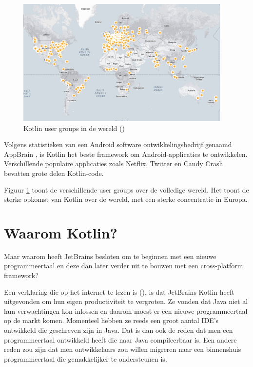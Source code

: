 \begin{figure} [ht]
	\centering
	\includegraphics[width=0.95\textwidth]{img/KUGmap.png}
	\caption{Kotlin user groups in de wereld (\cite{JetBrains12})}
	\label{fig:usergroups}
\end{figure}

Volgens statistieken van een Android software ontwikkelingsbedrijf genaamd AppBrain \autocite{AppBrain}, is Kotlin het beste framework om Android-applicaties te ontwikkelen. Verschillende populaire applicaties zoals Netflix, Twitter en Candy Crash bevatten grote delen Kotlin-code.

Figuur \ref{fig:usergroups} toont de verschillende user groups over de volledige wereld. Het toont de sterke opkomst van Kotlin over de wereld, met een sterke concentratie in Europa.

\section{Waarom Kotlin?}
\label{sec:whykotlin}
Maar waarom heeft JetBrains besloten om te beginnen met een nieuwe programmeertaal en deze dan later verder uit te bouwen met een cross-platform framework?

Een verklaring die op het internet te lezen is (\cite{TechYourChance}), is dat JetBrains Kotlin heeft uitgevonden om hun eigen productiviteit te vergroten. Ze vonden dat Java niet al hun verwachtingen kon inlossen en daarom moest er een nieuwe programmeertaal op de markt komen. Momenteel hebben ze reeds een groot aantal IDE's ontwikkeld die geschreven zijn in Java. Dat is dan ook de reden dat men een programmeertaal ontwikkeld heeft die naar Java compileerbaar is. Een andere reden zou zijn dat men ontwikkelaars zou willen migreren naar een binnenshuis programmeertaal die gemakkelijker te ondersteunen is.

